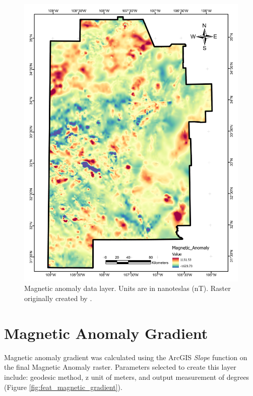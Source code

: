 \begin{figure}[H]
\centering
\includegraphics[width=0.75\linewidth]{templates/images/Figure-MagneticAnomaly.pdf}
\caption[Magnetic anomaly data layer]{Magnetic anomaly data layer. Units are in nanoteslas (nT). Raster originally created by \protect\citet{bielicki_hydrogeolgic_2015}.}
\label{fig:feat_magnetics}
\end{figure}
\pagebreak

\section{Magnetic Anomaly Gradient}\label{app:dl_magnetic_gradient}
Magnetic anomaly gradient was calculated using the ArcGIS \textit{Slope} function on the final Magnetic Anomaly raster. Parameters selected to create this layer include: geodesic method, z unit of meters, and output measurement of degrees (Figure \ref{fig:feat_magnetic_gradient}).

